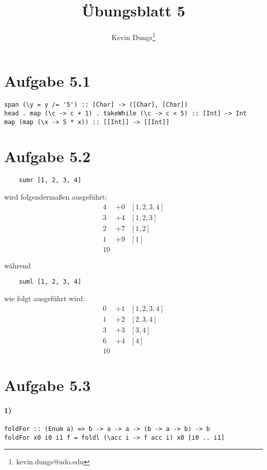 \documentclass[a4paper]{scrartcl}
\title{Übungsblatt 5}
\author{Kevin Dungs\thanks{kevin.dungs@udo.edu}}
\begin{document}
\maketitle


\section*{Aufgabe 5.1}
\begin{verbatim}
span (\y = y /= '5') :: [Char] -> ([Char], [Char])
head . map (\c -> c + 1) . takeWhile (\c -> c < 5) :: [Int] -> Int
map (map (\x -> 5 * x)) :: [[Int]] -> [[Int]]
\end{verbatim}


\section*{Aufgabe 5.2}
\begin{verbatim}
    sumr [1, 2, 3, 4]
\end{verbatim}
wird folgendermaßen ausgeführt:
\begin{align*}
    4 &+ 0 & [1, 2, 3, 4] \\
    3 &+ 4 & [1, 2, 3] \\
    2 &+ 7 & [1, 2] \\
    1 &+ 9 & [1] \\
    10
\end{align*}

während
\begin{verbatim}
    suml [1, 2, 3, 4]
\end{verbatim}
wie folgt ausgeführt wird:
\begin{align*}
    0 &+ 1 & [1, 2, 3, 4] \\
    1 &+ 2 & [2, 3, 4] \\
    3 &+ 3 & [3, 4] \\
    6 &+ 4 & [4] \\
    10
\end{align*}


\section*{Aufgabe 5.3}
\paragraph{1)}
\begin{verbatim}
foldFor :: (Enum a) => b -> a -> a -> (b -> a -> b) -> b
foldFor x0 i0 i1 f = foldl (\acc i -> f acc i) x0 [i0 .. i1]
\end{verbatim}
\end{document}
